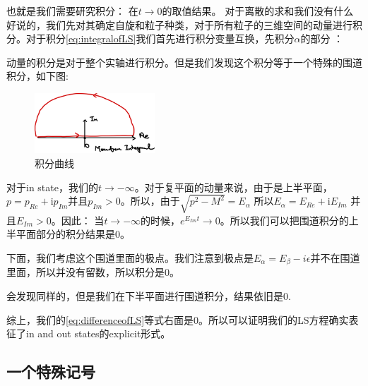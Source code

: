 也就是我们需要研究积分：
在$ t \to 0 $的取值结果。
对于离散的求和我们没有什么好说的，我们先对其确定自旋和粒子种类，对于所有粒子的三维空间的动量进行积分。对于积分\cref{eq:integralofLS}我们首先进行积分变量互换，先积分$ \alpha $的部分 ：

动量的积分是对于整个实轴进行积分。但是我们发现这个积分等于一个特殊的围道积分，如下图:
\begin{figure}[H]
  \centering
  \includegraphics[width=0.4\textwidth]{2025-07-21-14-05-54.png}
  \caption{积分曲线}
  \label{fig:inteloop}
\end{figure}
对于in state，我们的$ t \to -\infty $。对于复平面的动量来说，由于是上半平面，$ p = p_{Re} +\mathrm{i}p_{Im}$并且$ p_{Im} >0 $。所以，由于$ \sqrt{p^2-M^2} = E_\alpha  $ 所以$ E_\alpha = E_{Re} +\mathrm{i}E_{Im} $ 并且$ E_{Im}>0 $。因此：
当$ t \to -\infty $的时候，$ e^{E_{Im}t} \to 0 $。所以我们可以把围道积分的上半平面部分的积分结果是0。

下面，我们考虑这个围道里面的极点。我们注意到极点是$ E_\alpha = E_\beta -i\epsilon $并不在围道里面，所以并没有留数，所以积分是0。


会发现同样的，但是我们在下半平面进行围道积分，结果依旧是0.

综上，我们的\cref{eq:differenceofLS}等式右面是0。所以可以证明我们的LS方程确实表征了in and out states的explicit形式。

\subsection{一个特殊记号}

